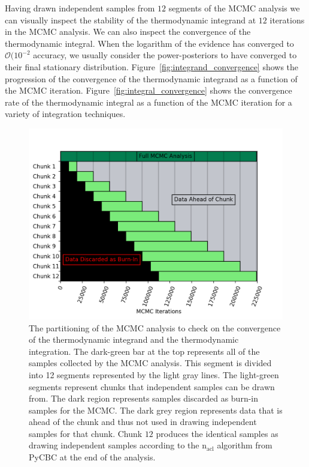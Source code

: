 Having drawn independent samples from $12$ segments of the MCMC analysis we can visually inspect the stability of the thermodynamic integrand at $12$ iterations in the MCMC analysis. We can also inspect the convergence of the thermodynamic integral. When the logarithm of the evidence has converged to $\mathcal{O}(10^{-2}$ accuracy, we usually consider the power-posteriors to have converged to their final stationary distribution. Figure~\ref{fig:integrand_convergence} shows the progression of the convergence of the thermodynamic integrand as a function of the MCMC iteration. Figure~\ref{fig:integral_convergence} shows the convergence rate of the thermodynamic integral as a function of the MCMC iteration for a variety of integration techniques.

\begin{figure}[th]
\centering
\includegraphics[width=1.0\columnwidth]{figs/chapter6/convergence_segmentation_lvc_sim.png}
\caption{The partitioning of the MCMC analysis to check on the convergence of the thermodynamic integrand and the thermodynamic integration. The dark-green bar at the top represents all of the samples collected by the MCMC analysis. This segment is divided into 12 segments represented by the light gray lines. The light-green segments represent chunks that independent samples can be drawn from. The dark region represents samples discarded as burn-in samples for the MCMC. The dark grey region represents data that is ahead of the chunk and thus not used in drawing independent samples for that chunk. Chunk $12$ produces the identical samples as drawing independent samples according to the $\mathrm{n_{acl}}$ algorithm from PyCBC at the end of the analysis.}
\label{fig:nacl_segments}
\end{figure}

